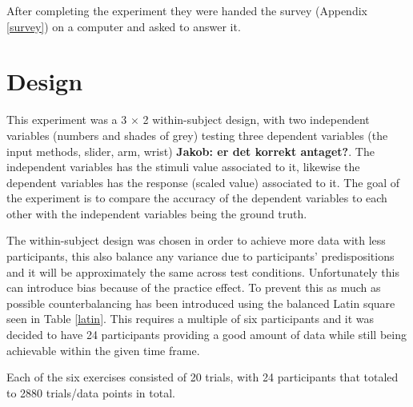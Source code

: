 After completing the experiment they were handed the survey (Appendix \ref{survey}) on a computer and asked to answer it. 

\section{Design}
This experiment was a 3 $\times$ 2 within-subject design, with two independent variables (numbers and shades of grey) testing three dependent variables (the input methods, slider, arm, wrist) \textbf{Jakob: er det korrekt antaget?}. The independent variables has the stimuli value associated to it, likewise the dependent variables has the response (scaled value) associated to it. The goal of the experiment is to compare the accuracy of the dependent variables to each other with the independent variables being the ground truth.

The within-subject design was chosen in order to achieve more data with less participants, this also balance any variance due to participants’ predispositions and it will be approximately the same across test conditions. Unfortunately this can introduce bias because of the practice effect. To prevent this as much as possible counterbalancing has been introduced using the balanced Latin square seen in Table \ref{latin}. This requires a multiple of six participants and it was decided to have 24 participants providing a good amount of data while still being achievable within the given time frame.

Each of the six exercises consisted of 20 trials, with 24 participants that totaled to 2880 trials/data points in total.

